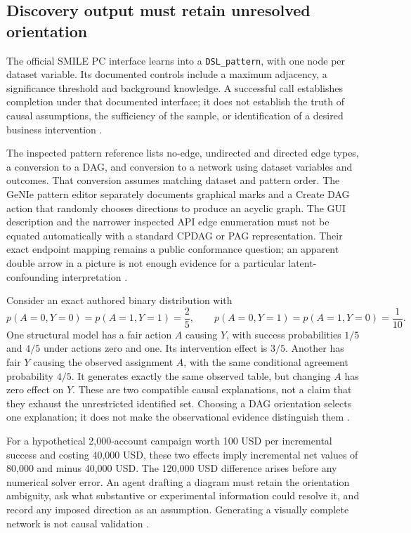 \subsection{Discovery output must retain unresolved orientation}
The official SMILE PC interface learns into a \texttt{DSL\_pattern}, with
one node per dataset variable. Its documented controls include a maximum
adjacency, a significance threshold and background knowledge. A successful
call establishes completion under that documented interface; it does not
establish the truth of causal assumptions, the sufficiency of the sample,
or identification of a desired business intervention
\cite{exec13_smile_pc,exec24_smile_choice}.

The inspected pattern reference lists no-edge, undirected and directed edge
types, a conversion to a DAG, and conversion to a network using dataset
variables and outcomes. That conversion assumes matching dataset and
pattern order. The GeNIe pattern editor separately documents graphical
marks and a Create DAG action that randomly chooses directions to produce
an acyclic graph. The GUI description and the narrower inspected API edge
enumeration must not be equated automatically with a standard CPDAG or PAG
representation. Their exact endpoint mapping remains a public conformance
question; an apparent double arrow in a picture is not enough evidence
for a particular latent-confounding interpretation
\cite{exec13_smile_pattern,exec13_genie_pattern,exec24_smile_choice}.

Consider an exact authored binary distribution with
\[
 p(A=0,Y=0)=p(A=1,Y=1)=\frac25,\qquad
 p(A=0,Y=1)=p(A=1,Y=0)=\frac1{10}.
\]
One structural model has a fair action $A$ causing $Y$, with success
probabilities $1/5$ and $4/5$ under actions zero and one. Its intervention
effect is $3/5$. Another has fair $Y$ causing the observed assignment $A$,
with the same conditional agreement probability $4/5$. It generates exactly
the same observed table, but changing $A$ has zero effect on $Y$.
These are two compatible causal explanations, not a claim that they exhaust
the unrestricted identified set. Choosing a DAG orientation selects one
explanation; it does not make the observational evidence distinguish them
\cite{exec24_smile_choice}.

For a hypothetical 2,000-account campaign worth 100 USD per incremental
success and costing 40,000 USD, these two effects imply incremental net
values of 80,000 and minus 40,000 USD. The 120,000 USD difference arises
before any numerical solver error. An agent drafting a diagram must retain
the orientation ambiguity, ask what substantive or experimental information
could resolve it, and record any imposed direction as an assumption.
Generating a visually complete network is not causal validation
\cite{exec24_smile_choice}.


